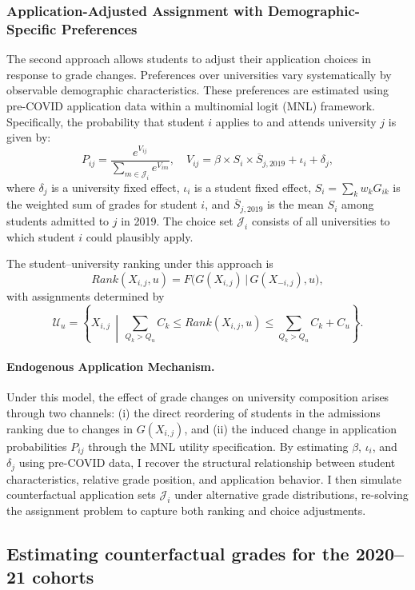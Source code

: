 \subsubsection{Application-Adjusted Assignment with Demographic-Specific Preferences}

The second approach allows students to adjust their application choices in response to grade changes. Preferences over universities vary systematically by observable demographic characteristics. These preferences are estimated using pre-COVID application data within a multinomial logit (MNL) framework. Specifically, the probability that student $i$ applies to and attends university $j$ is given by:
\[
P_{ij} = \frac{e^{V_{ij}}}{\sum_{m\in\mathcal{J}_i} e^{V_{im}}},
\quad
V_{ij} = \beta \times S_i \times \overline{S}_{j,2019} + \iota_i + \delta_j,
\]
where $\delta_j$ is a university fixed effect, $\iota_i$ is a student fixed effect,  
$S_i = \sum_{k} w_k G_{ik}$ is the weighted sum of grades for student $i$, and $\overline{S}_{j,2019}$ is the mean $S_i$ among students admitted to $j$ in 2019.  
The choice set $\mathcal{J}_i$ consists of all universities to which student $i$ could plausibly apply.

The student--university ranking under this approach is
\[
Rank(X_{i,j}, u) = F\big(G(X_{i,j}) \,\big|\, G(X_{-i,j}), u\big),
\]
with assignments determined by
\[
\mathcal{U}_u = \left\{X_{i,j} \,\middle|\, \sum_{Q_k > Q_u} C_k \le Rank(X_{i,j}, u) \le \sum_{Q_k > Q_u} C_k + C_u \right\}.
\]

\paragraph{Endogenous Application Mechanism.}  
Under this model, the effect of grade changes on university composition arises through two channels:  
(i) the direct reordering of students in the admissions ranking due to changes in $G(X_{i,j})$, and  
(ii) the induced change in application probabilities $P_{ij}$ through the MNL utility specification. By estimating $\beta$, $\iota_i$, and $\delta_j$ using pre-COVID data, I recover the structural relationship between student characteristics, relative grade position, and application behavior. I then simulate counterfactual application sets $\mathcal{J}_i$ under alternative grade distributions, re-solving the assignment problem to capture both ranking and choice adjustments.
\subsection{Estimating counterfactual grades for the 2020--21 cohorts}

